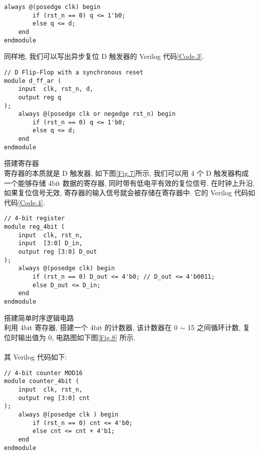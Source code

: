 \documentclass[UTF8,fontset=fandol]{ctexart}
\begin{document}
\begin{ExSteps}
\begin{lstlisting}[style=verilogstyle, caption={同步复位 D 触发器}, label={Code.2}]
    always @(posedge clk) begin
        if (rst_n == 0) q <= 1'b0;
        else q <= d;
    end
endmodule
    \end{lstlisting}
    同样地, 我们可以写出异步复位 D 触发器的 Verilog 代码\ref{Code.3}.
    \begin{lstlisting}[style=verilogstyle, caption={异步复位 D 触发器}, label={Code.3}]
// D Flip-Flop with a synchronous reset
module d_ff_ar (
    input  clk, rst_n, d,
    output reg q
);
    always @(posedge clk or negedge rst_n) begin
        if (rst_n == 0) q <= 1'b0;
        else q <= d;
    end
endmodule
    \end{lstlisting}
    \step 搭建寄存器\\
    寄存器的本质就是 D 触发器, 如下图\ref{Fig.7}所示, 我们可以用 4 个 D 触发器构成一个能够存储 4bit 数据的寄存器, 同时带有低电平有效的复位信号. 在时钟上升沿, 如果复位信号无效, 寄存器的输入信号就会被存储在寄存器中. 它的 Verilog 代码如代码\ref{Code.4}.\\
    \begin{lstlisting}[style=verilogstyle, caption={4bit 寄存器}, label={Code.4}]
// 4-bit register
module reg_4bit (
    input  clk, rst_n,
    input  [3:0] D_in,
    output reg [3:0] D_out 
);
    always @(posedge clk) begin
        if (rst_n == 0) D_out <= 4'b0; // D_out <= 4'b0011;
        else D_out <= D_in;
    end
endmodule
    \end{lstlisting}
    \step 搭建简单时序逻辑电路\\
    利用 4bit 寄存器, 搭建一个 4bit 的计数器, 该计数器在 0 $\sim $ 15 之间循环计数, 复位时输出值为 0, 电路图如下图\ref{Fig.8} 所示.\\
    \\
    其 Verilog 代码如下:
    \begin{lstlisting}[style=verilogstyle, caption={4bit 计数器}, label={Code.5}]
// 4-bit counter MOD16
module counter_4bit (
    input  clk, rst_n, 
    output reg [3:0] cnt 
);
    always @(posedge clk ) begin
        if (rst_n == 0) cnt <= 4'b0;
        else cnt <= cnt + 4'b1;
    end
endmodule
    \end{lstlisting}
  \end{ExSteps}
\end{document}
